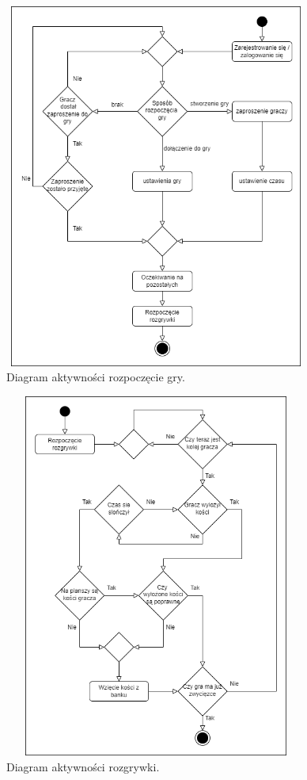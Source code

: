 \begin{figure}[h!]
	\begin{center}
		\includegraphics[width=10cm,height=12cm]{img/activity-diagram-start-game.png}
	\end{center}
	\caption{{\color{dgray} Diagram aktywności rozpoczęcie gry.}} 
	\label{diagram-aktywnosci-start}
\end{figure}

\begin{figure}[h!]
	\begin{center}
		\includegraphics[width=10cm,height=12cm]{img/activity-diagram-game.png}
	\end{center}
	\caption{{\color{dgray} Diagram aktywności rozgrywki.}} 
	\label{diagram-aktywnosci-game}
\end{figure}  





